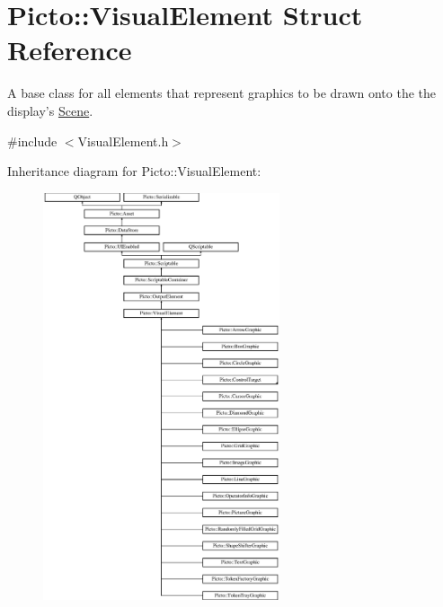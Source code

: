 \hypertarget{struct_picto_1_1_visual_element}{\section{Picto\-:\-:Visual\-Element Struct Reference}
\label{struct_picto_1_1_visual_element}
}


A base class for all elements that represent graphics to be drawn onto the the display's \hyperlink{class_picto_1_1_scene}{Scene}.  




{\ttfamily \#include $<$Visual\-Element.\-h$>$}

Inheritance diagram for Picto\-:\-:Visual\-Element\-:\begin{figure}[H]
\begin{center}
\leavevmode
\includegraphics[height=12.000000cm]{struct_picto_1_1_visual_element}
\end{center}
\end{figure}
